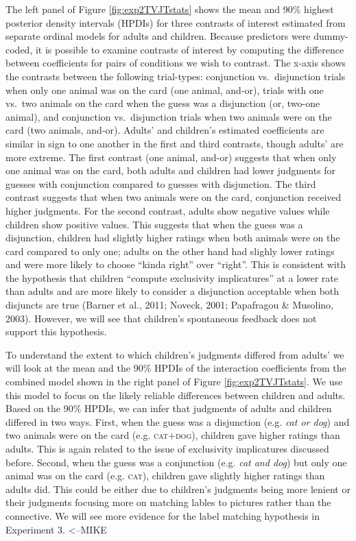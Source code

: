 \documentclass[,man,floatsintext]{apa6}
\begin{document}
The left panel of Figure \ref{fig:exp2TVJTstats} shows the mean and 90\% highest posterior density intervals (HPDIs) for three contrasts of interest estimated from separate ordinal models for adults and children. Because predictors were dummy-coded, it is possible to examine contrasts of interest by computing the difference between coefficients for pairs of conditions we wish to contrast. The x-axis shows the contrasts between the following trial-types: conjunction vs.~disjunction trials when only one animal was on the card (one animal, and-or), trials with one vs.~two animals on the card when the guess was a disjunction (or, two-one animal), and conjunction vs.~disjunction trials when two animals were on the card (two animals, and-or). Adults' and children's estimated coefficients are similar in sign to one another in the first and third contrasts, though adults' are more extreme. The first contrast (one animal, and-or) suggests that when only one animal was on the card, both adults and children had lower judgments for guesses with conjunction compared to guesses with disjunction. The third contrast suggests that when two animals were on the card, conjunction received higher judgments. For the second contrast, adults show negative values while children show positive values. This suggests that when the guess was a disjunction, children had slightly higher ratings when both animals were on the card compared to only one; adults on the other hand had slighly lower ratings and were more likely to choose \enquote{kinda right} over \enquote{right}. This is consistent with the hypothesis that children \enquote{compute exclusivity implicatures} at a lower rate than adults and are more likely to consider a disjunction acceptable when both disjuncts are true (Barner et al., 2011; Noveck, 2001; Papafragou \& Musolino, 2003). However, we will see that children's spontaneous feedback does not support this hypothesis.

To understand the extent to which children's judgments differed from adults' we will look at the mean and the 90\% HPDIs of the interaction coefficients from the combined model shown in the right panel of Figure \ref{fig:exp2TVJTstats}. We use this model to focus on the likely reliable differences between children and adults. Based on the 90\% HPDIs, we can infer that judgments of adults and children differed in two ways. First, when the guess was a disjunction (e.g. \emph{cat or dog}) and two animals were on the card (e.g. \textsc{cat+dog}), children gave higher ratings than adults. This is again related to the issue of exclusivity implicatures discussed before. Second, when the guess was a conjunction (e.g. \emph{cat and dog}) but only one animal was on the card (e.g. \textsc{cat}), children gave slightly higher ratings than adults did. This could be either due to children's judgments being more lenient or their judgments focusing more on matching lables to pictures rather than the connective. We will see more evidence for the label matching hypothesis in Experiment 3. \textless{}--MIKE
\end{document}
